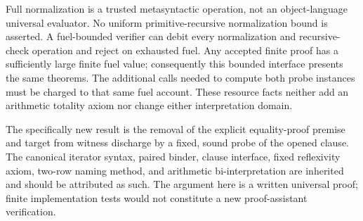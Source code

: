 Full normalization is a trusted metasyntactic operation, not an
object-language universal evaluator.  No uniform primitive-recursive
normalization bound is asserted.  A fuel-bounded verifier can debit every
normalization and recursive-check operation and reject on exhausted fuel.
Any accepted finite proof has a sufficiently large finite fuel value;
consequently this bounded interface presents the same theorems.  The
additional calls needed to compute both probe instances must be charged to
that same fuel account.  These resource facts neither add an arithmetic
totality axiom nor change either interpretation domain.

The specifically new result is the removal of the explicit equality-proof
premise and target from witness discharge by a fixed, sound probe of the
opened clause.  The canonical iterator syntax, paired binder, clause
interface, fixed reflexivity axiom, two-row naming method, and arithmetic
bi-interpretation are inherited and should be attributed as such.  The
argument here is a written universal proof; finite implementation tests
would not constitute a new proof-assistant verification.
